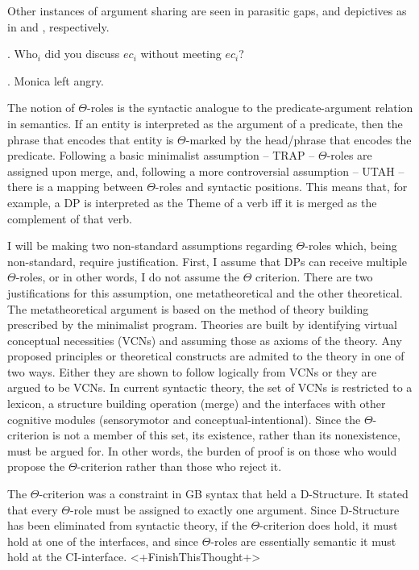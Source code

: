 \documentclass[letterpaper,12pt]{article}
\begin{document}
Other instances of argument sharing are seen in parasitic gaps, and depictives as in \Next and \NNext, respectively.

\ex. Who$_i$ did you discuss $ec_i$ without meeting $ec_i$?

\ex. Monica left angry.

The notion of $\Theta$-roles is the syntactic analogue to the predicate-argument relation in semantics.
If an entity is interpreted as the argument of a predicate, then the phrase that encodes that entity is $\Theta$-marked by the head/phrase that encodes the predicate.
Following a basic minimalist assumption -- TRAP \parencite{hornsteinetal2005understanding} -- $\Theta$-roles are assigned upon merge, and, following a more controversial assumption -- UTAH \parencite{baker1988incorporation}-- there is a mapping between $\Theta$-roles and syntactic positions.
This means that, for example, a DP is interpreted as the Theme of a verb iff it is merged as the complement of that verb.

I will be making two non-standard assumptions regarding $\Theta$-roles which, being non-standard, require justification.
First, I assume that DPs can receive multiple $\Theta$-roles, or in other words, I do not assume the $\Theta$ criterion.
There are two justifications for this assumption, one metatheoretical and the other theoretical.
The metatheoretical argument is based on the method of theory building prescribed by the minimalist program.
Theories are built by identifying virtual conceptual necessities (VCNs) and assuming those as axioms of the theory.
Any proposed principles or theoretical constructs are admited to the theory in one of two ways.
Either they are shown to follow logically from VCNs or they are argued to be VCNs.
In current syntactic theory, the set of VCNs is restricted to a lexicon, a structure building operation (merge) and the interfaces with other cognitive modules (sensorymotor and conceptual-intentional).
Since the $\Theta$-criterion is not a member of this set, its existence, rather than its nonexistence, must be argued for.
In other words, the burden of proof is on those who would propose the $\Theta$-criterion rather than those who reject it.

The $\Theta$-criterion was a constraint in GB syntax that held a D-Structure. 
It stated that every $\Theta$-role must be assigned to exactly one argument.
Since D-Structure has been eliminated from syntactic theory, if the $\Theta$-criterion does hold, it must hold at one of the interfaces, and since $\Theta$-roles are essentially semantic it must hold at the CI-interface.
<+FinishThisThought+>
\end{document}
